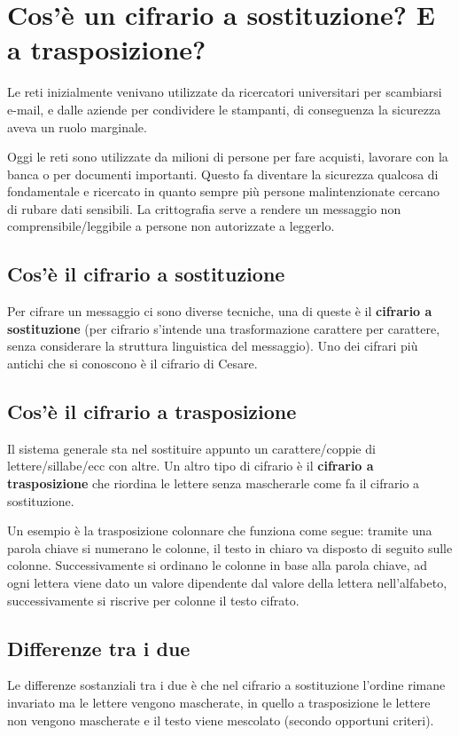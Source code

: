 \section{Cos’è un cifrario a sostituzione? E a trasposizione?}

Le reti inizialmente venivano utilizzate da ricercatori universitari per scambiarsi e-mail, e dalle aziende per condividere le stampanti, di conseguenza la sicurezza aveva un ruolo marginale.

Oggi le reti sono utilizzate da milioni di persone per fare acquisti, lavorare con la banca o per documenti importanti. Questo fa diventare la sicurezza qualcosa di fondamentale e ricercato in quanto sempre più persone malintenzionate cercano di rubare dati sensibili.
La crittografia serve a rendere un messaggio non comprensibile/leggibile a persone non autorizzate a leggerlo.
\subsection{Cos'è il cifrario a sostituzione}
Per cifrare un messaggio ci sono diverse tecniche, una di queste è il \textbf{cifrario a sostituzione} (per cifrario s’intende una trasformazione carattere per carattere, senza considerare la struttura linguistica del messaggio). Uno dei cifrari più antichi che si conoscono è il cifrario di Cesare.
\subsection{Cos'è il cifrario a trasposizione}
Il sistema generale sta nel sostituire appunto un carattere/coppie di lettere/sillabe/ecc con altre.
Un altro tipo di cifrario è il \textbf{cifrario a trasposizione} che riordina le lettere senza mascherarle come fa il cifrario a sostituzione.

Un esempio è la trasposizione colonnare che funziona come segue: tramite una parola chiave si numerano le colonne, il testo in chiaro va disposto di seguito sulle colonne. Successivamente si ordinano le colonne in base alla parola chiave, ad ogni lettera viene dato un valore dipendente dal valore della lettera nell’alfabeto, successivamente si riscrive per colonne il testo cifrato.

\subsection{Differenze tra i due}
Le differenze sostanziali tra i due è che nel cifrario a sostituzione l’ordine rimane invariato ma le lettere vengono mascherate, in quello a trasposizione le lettere non vengono mascherate e il testo viene mescolato (secondo opportuni criteri).

